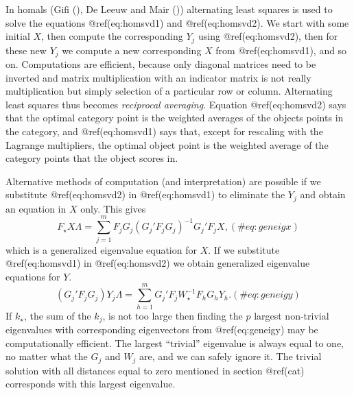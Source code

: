 \documentclass[
  12pt,
  letterpaper,
  DIV=11,
  numbers=noendperiod]{scrartcl}
\begin{document}
In homals (Gifi (), De Leeuw and Mair
()) alternating least squares is
used to solve the equations @ref(eq:homsvd1) and @ref(eq:homsvd2). We
start with some initial \(X\), then compute the corresponding \(Y_j\)
using @ref(eq:homsvd2), then for these new \(Y_j\) we compute a new
corresponding \(X\) from @ref(eq:homsvd1), and so on. Computations are
efficient, because only diagonal matrices need to be inverted and matrix
multiplication with an indicator matrix is not really multiplication but
simply selection of a particular row or column. Alternating least
squares thus becomes \emph{reciprocal averaging}. Equation
@ref(eq:homsvd2) says that the optimal category point is the weighted
averages of the objects points in the category, and @ref(eq:homsvd1)
says that, except for rescaling with the Lagrange multipliers, the
optimal object point is the weighted average of the category points that
the object scores in.

Alternative methods of computation (and interpretation) are possible if
we substitute @ref(eq:homsvd2) in @ref(eq:homsvd1) to eliminate the
\(Y_j\) and obtain an equation in \(X\) only. This gives
\begin{equation}
F_\star X\Lambda=\sum_{j=1}^m F_jG_j(G_j'F_jG_j)^{-1}G_j'F_jX,
(\#eq:geneigx)
\end{equation} which is a generalized eigenvalue equation for \(X\). If
we substitute @ref(eq:homsvd1) in @ref(eq:homsvd2) we obtain generalized
eigenvalue equations for \(Y\). \begin{equation}
(G_j'F_jG_j)Y_j\Lambda=\sum_{h=1}^m G_j'F_jW_\star^{-1}F_hG_hY_h.
(\#eq:geneigy)
\end{equation} If \(k_\star\), the sum of the \(k_j\), is not too large
then finding the \(p\) largest non-trivial eigenvalues with
corresponding eigenvectors from @ref(eq:geneigy) may be computationally
efficient. The largest ``trivial'' eigenvalue is always equal to one, no
matter what the \(G_j\) and \(W_j\) are, and we can safely ignore it.
The trivial solution with all distances equal to zero mentioned in
section @ref(cat) corresponds with this largest eigenvalue.
\end{document}
